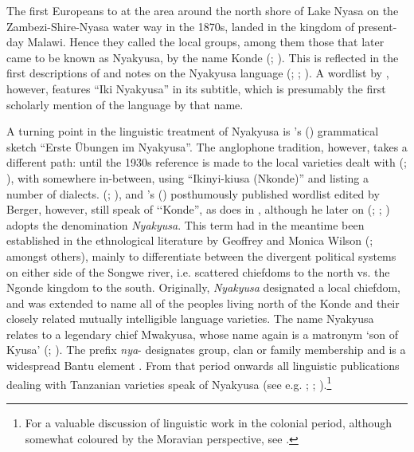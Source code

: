 The first Europeans to at the area around the north shore of Lake Nyasa on the Zambezi-Shire-Nyasa water way in the 1870s, landed in the  kingdom of present-day Malawi. Hence they called the local groups, among them those that later came to be known as Nyakyusa, by the name Konde (\citealt[36–40]{PreinP1995}; \citealt[1–5]{WilsonM1963}). This is reflected in the first descriptions of and notes on the Nyakyusa language (\citealt{MeinhofC1966}; \citealt{SchumannK1899}; \citealt{Cleve1904}). A wordlist by \citet{MerenskyA1894}, however, features ``Iki Nyakyusa'' in its subtitle, which is presumably the first scholarly mention of the language by that name.

A turning point in the linguistic treatment of Nyakyusa is \citeauthor{EndemannC1914}'s (\citeyear{EndemannC1914}) grammatical sketch ``Erste Übungen im Nyakyusa''. The anglophone tradition, however, takes a different path: until the 1930s reference is made to the local varieties dealt with (\citealt{BainJ1891}; \citealt{HodsonT1934}), with \citet[208 et passim]{JohnstonH1977} somewhere in-between, using ``Ikinyi-kiusa (Nkonde)'' and listing a number of dialects. \citeauthor{BergerP1933} (\citeyear{BergerP1933}; \citeyear{BergerP1938}), and \citeauthor{StolzA1934}'s (\citeyear{StolzA1934}) posthumously published wordlist edited by Berger, however, still speak of \lq\lq Konde'', as does \citeauthor{BusseJ1942} in \citeyear{BusseJ1942}, although he later on (\citeyear{BusseJ1949}; \citeyear{BusseJ1957}; \citeyear{BusseJnd}) adopts the denomination \textit{Nyakyusa}. This term had in the meantime been established in the ethnological literature by Geoffrey and Monica Wilson (\citeyear{WilsonG1936}; \citeyear{WilsonG1937} amongst others), mainly to differentiate between the divergent political systems on either side of the Songwe river, i.e. scattered chiefdoms to the north vs. the Ngonde kingdom to the south. Originally, \textit{Nyakyusa} designated a local chiefdom, and was extended to name all of the peoples living north of the Konde and their closely related mutually intelligible language varieties. The name Nyakyusa relates to a legendary chief Mwakyusa, whose name again is a matronym `son of Kyusa' (\citealt[42f]{LabroussiC1998}; \citealt[91–95]{WeberP1998}). The prefix \textit{nya}- designates group, clan or family membership and is a widespread Bantu element \citep{MeeussenA1967}. From that period onwards all linguistic publications dealing with Tanzanian varieties speak of Nyakyusa (see e.g. \citealt{GuthrieM1967}; \citealt{MwangokaNVoorhoeveJ1960b}; \citealt{vanEssenOKaehler-MeyerE1969}).\footnote{For a valuable discussion of linguistic work in the colonial period, although somewhat coloured by the Moravian perspective, see \citet{KroegerR2011}.}
